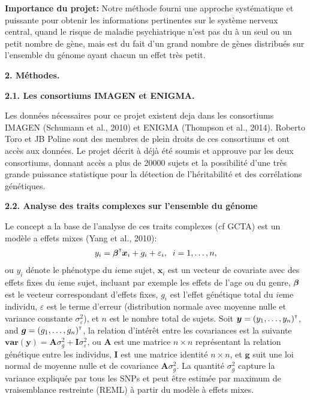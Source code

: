 \documentclass[11pt]{article}
\newcommand{\var}{\mathbf{var}}
\newcommand{\trans}{^{\mbox{\tiny {\sf T}}}}
\newcommand{\Abf}{{\bm A}}
\newcommand{\Ibf}{{\bm I}}
\newcommand{\gbf}{{\bm g}}
\newcommand{\xbf}{{\bm x}}
\newcommand{\ybf}{{\bm y}}
\newcommand{\greekbold}[1]{\mbox{\boldmath $#1$}}
\newcommand{\betabf}{\greekbold{\beta}}
\begin{document}
\noindent
\textbf{Importance du projet:} Notre méthode fourni une approche systématique et puissante pour obtenir les informations pertinentes sur le système nerveux central, quand le risque de maladie psychiatrique n'est pas du à un seul ou un petit nombre de gène, mais est du fait d'un grand nombre de gènes distribués sur l'ensemble du génome ayant chacun un effet très petit. 
\bigskip



\noindent
{\large \textbf{2. Méthodes.}}
\medskip

\noindent
\textbf{2.1. Les consortiums IMAGEN et ENIGMA.}
\smallskip

\noindent
Les données nécessaires pour ce projet existent deja dans les consortiums IMAGEN (Schumann et al., 2010) et ENIGMA (Thompson et al., 2014). Roberto Toro et JB Poline sont des membres de plein droits de ces consortiums et ont accès aux données. Le projet décrit à déjà été soumis et approuve par les deux consortiums, donnant accès a plus de 20000 sujets et la possibilité d'une très grande puissance statistique pour la détection de l'héritabilité et des corrélations génétiques. 

\medskip


\noindent
\textbf{2.2. Analyse des traits complexes sur l'ensemble du génome}
\smallskip

\noindent
Le concept a la base de l'analyse de ces traits complexes (cf GCTA) est un modèle a effets mixes (Yang et al., 2010):
\begin{eqnarray} \label{eqn:lm}
y_i = \betabf\trans \xbf_i + g_i + \varepsilon_i, \;\; i = 1, \ldots, n,
\end{eqnarray}
ou $y_i$ dénote le phénotype du $i$eme sujet, $\xbf_i$ est un vecteur de covariate avec des effets fixes du $i$eme sujet, incluant par exemple les effets de l'age ou du genre, $\betabf$ est le vecteur correspondant d'effets fixes, $g_i$ est l'effet génétique total du $i$eme individu, $\varepsilon$ est le terme d'erreur (distribution normale avec moyenne nulle et variance constante $\sigma^2_\varepsilon$), et $n$ est le nombre total de sujets. 
Soit $\ybf = (y_1, \ldots, y_n)\trans$, and $\gbf = (g_1, \ldots, g_n)\trans$, la relation d'intérêt entre les covariances est la suivante $\var(\ybf) = \Abf \sigma^2_g + \Ibf \sigma^2_\varepsilon$,
ou $\Abf$ est une matrice $n \times n$ représentant la relation génétique entre les individus, $\Ibf$ est une matrice identité $n \times n$, et $\gbf$ suit une loi normal de moyenne nulle et de covariance $\Abf \sigma^2_g$. La quantité  $\sigma^2_g$ capture la  variance expliquée par tous les SNPs et peut être estimée par maximum de vraisemblance restreinte (REML) à partir du modèle à effets mixes.
\medskip
\end{document}
